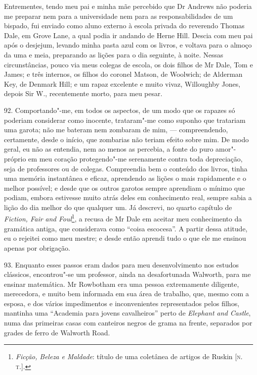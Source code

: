 Entrementes, tendo meu pai e minha mãe percebido que Dr Andrews não
poderia me preparar nem para a universidade nem para as
responsabilidades de um bispado, fui enviado como aluno externo à escola
privada do reverendo Thomas Dale, em Grove Lane, a qual podia ir andando
de Herne Hill. Descia com meu pai após o desjejum, levando minha pasta
azul com os livros, e voltava para o almoço da uma e meia, preparando as
lições para o dia seguinte, à noite. Nessas circunstâncias, pouco via
meus colegas de escola, os dois filhos de Mr Dale, Tom e James; e três
internos, os filhos do coronel Matson, de Woolwich; de Alderman Key, de
Denmark Hill; e um rapaz excelente e muito vivaz, Willoughby Jones,
depois Sir W., recentemente morto, para meu pesar.

92. Comportando"-me, em todos os aspectos, de um modo que os rapazes só
poderiam considerar como inocente, trataram"-me como suponho que
tratariam uma garota; não me bateram nem zombaram de mim, ---
compreendendo, certamente, desde o início, que zombarias não teriam
efeito sobre mim. De modo geral, eu não as entendia, nem ao menos as
percebia, a fonte do puro amor"-próprio em meu coração protegendo"-me
serenamente contra toda depreciação, seja de professores ou de colegas.
Compreendia bem o conteúdo dos livros, tinha uma memória instantânea e
eficaz, aprendendo as lições o mais rapidamente e o melhor possível; e
desde que os outros garotos sempre aprendiam o mínimo que podiam, embora
estivesse muito atrás deles em conhecimento real, sempre sabia a lição
do dia melhor do que qualquer um. Já descrevi, no quarto capítulo de
\emph{Fiction, Fair and Foul}\footnote{\emph{Ficção, Beleza e Maldade}:
  título de uma coletânea de artigos de Ruskin {[}\textsc{n.\,t.}{]}.}, a
recusa de Mr Dale em aceitar meu conhecimento da gramática antiga, que
considerava como ``coisa escocesa''. A partir dessa atitude, eu o
rejeitei como meu mestre; e desde então aprendi tudo o que ele me
ensinou apenas por obrigação.

93. Enquanto esses passos eram dados para meu desenvolvimento nos
estudos clássicos, encontrou"-se um professor, ainda na desafortunada
Walworth, para me ensinar matemática. Mr Rowbotham era uma pessoa
extremamente diligente, merecedora, e muito bem informada em sua área de
trabalho, que, mesmo com a esposa, e dos vários impedimentos e
inconvenientes representados pelos filhos, mantinha uma ``Academia para
jovens cavalheiros'' perto de \emph{Elephant and Castle}, numa das
primeiras casas com canteiros negros de grama na frente, separados por
grades de ferro de Walworth Road.

